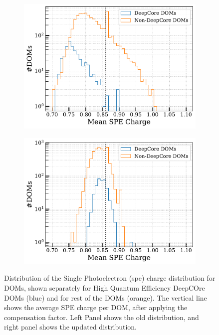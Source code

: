 \begin{figure}[h!]
    \begin{subfigure}[h]{0.7\textwidth}
        \includegraphics{./figures/results/Old.pdf}
    \end{subfigure}
    \hfill
    \begin{subfigure}[h]{0.7\textwidth}
        \includegraphics{./figures/results/simulation.pdf}
    \end{subfigure}
    
    \caption{Distribution of the Single Photoelectron (spe) charge distribution for DOMs, shown separately for High Quantum Efficiency DeepCOre DOMs (blue) and for rest of the DOMs (orange). The vertical line shows the average SPE charge per DOM, after applying the compensation factor. Left Panel shows the old distribution, and right panel shows the updated distribution.}
\end{figure}

